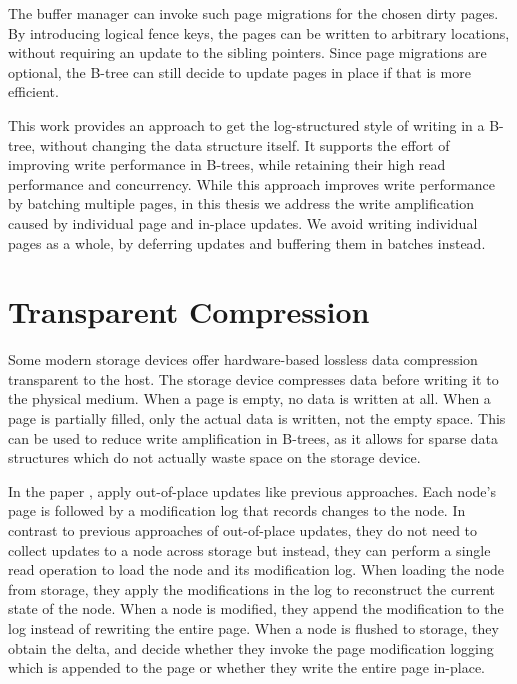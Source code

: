 The buffer manager can invoke such page migrations for the chosen dirty pages.
By introducing logical fence keys, the pages can be written to arbitrary locations, without requiring an update to the sibling pointers.
Since page migrations are optional, the B-tree can still decide to update pages in place if that is more efficient.

This work provides an approach to get the log-structured style of writing in a B-tree, without changing the data structure itself.
It supports the effort of improving write performance in B-trees, while retaining their high read performance and concurrency.
While this approach improves write performance by batching multiple pages, in this thesis we address the write amplification caused by individual page and in-place updates.
We avoid writing individual pages as a whole, by deferring updates and buffering them in batches instead.

\section{Transparent Compression}
Some modern storage devices offer hardware-based lossless data compression transparent to the host.
The storage device compresses data before writing it to the physical medium.
When a page is empty, no data is written at all.
When a page is partially filled, only the actual data is written, not the empty space.
This can be used to reduce write amplification in B-trees, as it allows for sparse data structures which do not actually waste space on the storage device.

In the paper \cite{qiao2022compression}, apply out-of-place updates like previous approaches.
Each node's page is followed by a modification log that records changes to the node.
In contrast to previous approaches of out-of-place updates, they do not need to collect updates to a node across storage but instead, they can perform a single read operation to load the node and its modification log.
When loading the node from storage, they apply the modifications in the log to reconstruct the current state of the node.
When a node is modified, they append the modification to the log instead of rewriting the entire page.
When a node is flushed to storage, they obtain the delta, and decide whether they invoke the page modification logging which is appended to the page or whether they write the entire page in-place.

